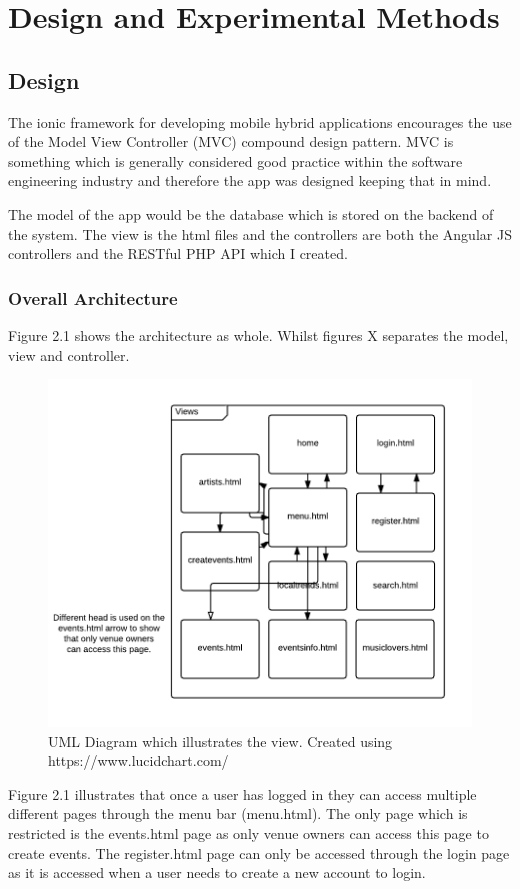 \chapter{Design and Experimental Methods}
\section{Design}
The ionic framework for developing mobile hybrid applications encourages the use of the Model View Controller (MVC) compound design pattern. MVC is something which is generally considered good practice within the software engineering industry and therefore the app was designed keeping that in mind.

The model of the app would be the database which is stored on the backend of the system. The view is the html files and the controllers are both the Angular JS controllers and the RESTful PHP API which I created.

\subsection{Overall Architecture}
Figure 2.1 shows the architecture as whole. Whilst figures X separates the model, view and controller.
\begin{figure}[H]
\includegraphics[width=\textwidth,height=\textheight,keepaspectratio]{images/va}
\caption{UML Diagram which illustrates the view. Created using https://www.lucidchart.com/}
\end{figure}
Figure 2.1 illustrates that once a user has logged in they can access multiple different pages through the menu bar (menu.html). The only page which is restricted is the events.html page as only venue owners can access this page to create events. The register.html page can only be accessed through the login page as it is accessed when a user needs to create a new account to login.

